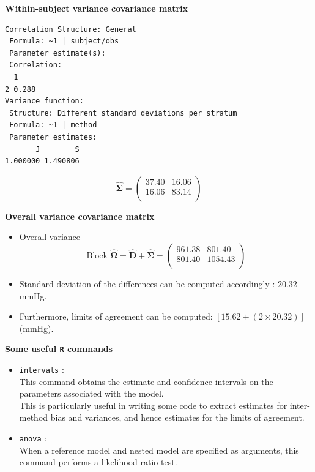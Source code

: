 \documentclass[compress]{beamer}        %
\makeatletter
\newcommand{\tcb}{\textcolor{beamer@blendedblue}}
\makeatother
\begin{document}
\begin{frame}[fragile]{\bf \tcb{Within-subject variance covariance matrix}}
\begin{verbatim}
Correlation Structure: General
 Formula: ~1 | subject/obs
 Parameter estimate(s):
 Correlation:
  1
2 0.288
Variance function:
 Structure: Different standard deviations per stratum
 Formula: ~1 | method
 Parameter estimates:
       J        S
1.000000 1.490806
\end{verbatim}
\[
 \hat{\boldsymbol{\Sigma}} = \left(
\begin{array}{cc}
37.40 & 16.06 \\
16.06 & 83.14 \\
\end{array}\right)
\]
\end{frame}
\begin{frame}[fragile]{\bf \tcb{Overall variance covariance matrix}}

\begin{itemize}\itemsep0.7cm
\item Overall variance \[
\mbox{Block }\hat{\boldsymbol{\Omega}} = \hat{\boldsymbol{D}} + \hat{\boldsymbol{\Sigma}} =
 \left(
\begin{array}{cc}
961.38 & 801.40 \\
801.40 & 1054.43 \\
\end{array}
\right)
\]

\item Standard deviation of the differences can be computed accordingly : 20.32 mmHg.

\item Furthermore, limits of agreement can be computed: $[15.62 \pm (2 \times 20.32) ]$ (mmHg).
\end{itemize}
\end{frame}

\begin{frame}{\bf \tcb{Some useful \texttt{R} commands}}
\large
\vspace{-0.7cm}
\begin{itemize}

\item \texttt{intervals} :\vspace{0.25cm} \\This command obtains the estimate and confidence intervals on the parameters associated with the model.\\
    This is particularly useful in writing some code to extract estimates for inter-method bias and variances, and hence estimates for the limits of agreement.

\item \texttt{anova} : \vspace{0.25cm} \\When a reference model and nested model are specified as arguments, this command performs a likelihood ratio test.
\end{itemize}
\end{frame}
\end{document}
